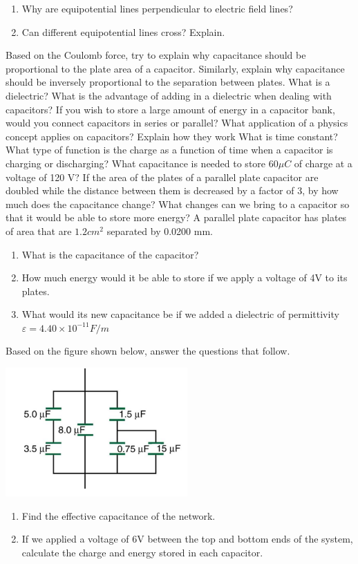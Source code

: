 \documentclass[12pt,addpoints]{exam}
\begin{document}
\begin{questions}
\begin{enumerate}[label=(\roman*)]
			\item Why are equipotential lines perpendicular to electric field lines?
			\item Can different equipotential lines cross? Explain.
		\end{enumerate}  
		\question Based on the Coulomb force, try to explain why capacitance should be proportional to the plate area of a
		capacitor. Similarly, explain why capacitance should be inversely proportional to the separation between plates. 
		\question What is a dielectric? What is the advantage of adding in a dielectric when dealing with capacitors?
		\question If you wish to store a large amount of energy in a capacitor bank, would you connect capacitors in series or parallel?
		\question What application of a physics concept applies on capacitors? Explain how they work
		\question What is time constant? What type of function is the charge as a function of time when a capacitor is charging or discharging?
		\question What capacitance is needed to store $60\mu C$ of charge at a voltage of 120 V?
		\question If the area of the plates of a parallel plate capacitor are doubled while the distance between them is decreased by a factor of 3, by how much does the capacitance change?
		\question What changes can we bring to a capacitor so that it would be able to store more energy?
		\question A parallel plate capacitor has plates of area that are $1.2cm^2$ separated by 0.0200 mm.
		\begin{enumerate}[label=(\roman*)]
			\item What is the capacitance of the capacitor?
			\item How much energy would it be able to store if we apply a voltage of 4V to its plates.
			\item What would its new capacitance be if we added a dielectric of permittivity $\varepsilon=4.40\times10^{-11}F/m$
		\end{enumerate}
		\question Based on the figure shown below, answer the questions that follow.
		\begin{center}
			\includegraphics[scale=0.8]{cap}
		\end{center}
		\begin{enumerate}[label=(\roman*)]
			\item Find the effective capacitance of the network.
			\item If we applied a voltage of 6V between the top and bottom ends of the system, calculate the charge and energy stored in each capacitor.
		\end{enumerate}
	\end{questions}		
\end{document}
